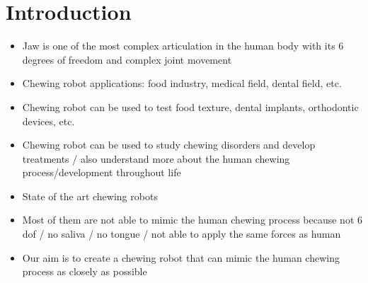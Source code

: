 \section{Introduction}

\begin{itemize}
    \item Jaw is one of the most complex articulation in the human body with its 6 degrees of freedom and complex joint movement
    \item Chewing robot applications: food industry, medical field, dental field, etc.
    \item Chewing robot can be used to test food texture, dental implants, orthodontic devices, etc.
    \item Chewing robot can be used to study chewing disorders and develop treatments / also understand more about the human chewing process/development throughout life
    \item State of the art chewing robots
    \item Most of them are not able to mimic the human chewing process because not 6 dof / no saliva / no tongue / not able to apply the same forces as human
    \item Our aim is to create a chewing robot that can mimic the human chewing process as closely as possible
\end{itemize}